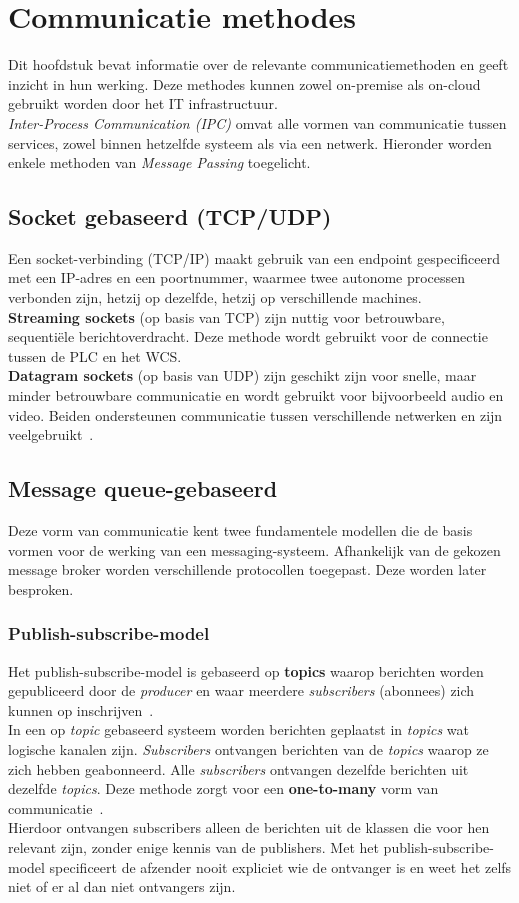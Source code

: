\section{Communicatie methodes}
Dit hoofdstuk bevat informatie over de relevante communicatiemethoden en geeft inzicht in hun werking.
Deze methodes kunnen zowel on-premise als on-cloud gebruikt worden door het IT infrastructuur.
\\
\emph{Inter-Process Communication (IPC)} omvat alle vormen van communicatie tussen services, 
zowel binnen hetzelfde systeem als via een netwerk. 
Hieronder worden enkele methoden van \emph{Message Passing} toegelicht.

\subsection{Socket gebaseerd (TCP/UDP)}
Een socket-verbinding (TCP/IP) maakt gebruik van een endpoint gespecificeerd met een IP-adres en een poortnummer, 
waarmee twee autonome processen verbonden zijn, hetzij op dezelfde, hetzij op verschillende machines.
\\
\textbf{Streaming sockets} (op basis van TCP) zijn nuttig voor betrouwbare, sequentiële berichtoverdracht.
Deze methode wordt gebruikt voor de connectie tussen de PLC en het WCS.
\\ 
\textbf{Datagram sockets} (op basis van UDP) zijn geschikt zijn voor snelle, maar minder betrouwbare communicatie en wordt gebruikt voor bijvoorbeeld audio en video.
Beiden ondersteunen communicatie tussen verschillende netwerken en zijn veelgebruikt~\autocite{Dinari2020}.


\subsection{Message queue-gebaseerd}
Deze vorm van communicatie kent twee fundamentele modellen die de basis vormen voor de werking van een messaging-systeem. 
Afhankelijk van de gekozen message broker worden verschillende protocollen toegepast. 
Deze worden later besproken.

\subsubsection{Publish-subscribe-model}
Het publish-subscribe-model is gebaseerd op \textbf{topics} waarop berichten worden gepubliceerd door de \emph{producer} 
en waar meerdere \emph{subscribers} (abonnees) zich kunnen op inschrijven~\autocite{Dinari2020}. 
\\
In een op \emph{topic} gebaseerd systeem worden berichten geplaatst in \emph{topics} wat logische kanalen zijn.
\emph{Subscribers} ontvangen berichten van de \emph{topics} waarop ze zich hebben geabonneerd.
Alle \emph{subscribers} ontvangen dezelfde berichten uit dezelfde \emph{topics}. 
Deze methode zorgt voor een \textbf{one-to-many} vorm van communicatie~\autocite{Dinari2020}.
\\
Hierdoor ontvangen subscribers alleen de berichten uit de klassen die voor hen relevant zijn, zonder enige kennis van de publishers. 
Met het publish-subscribe-model specificeert de afzender nooit expliciet wie de ontvanger is en weet het zelfs niet of er al dan niet ontvangers zijn.

